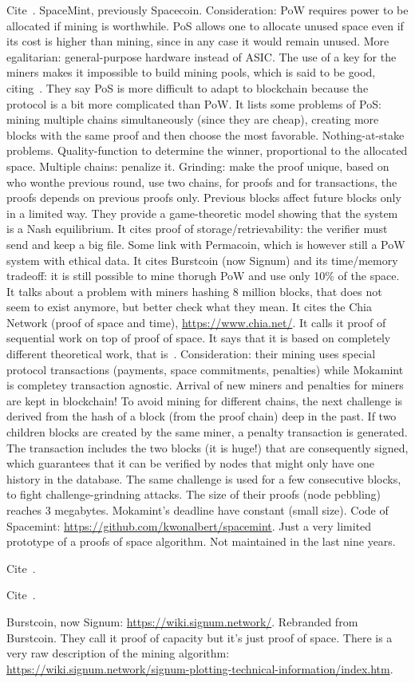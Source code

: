 Cite~\cite{ParkKFGAP18}. SpaceMint, previously Spacecoin. Consideration: PoW requires power
to be allocated if mining is worthwhile. PoS allows one to allocate unused space even if its
cost is higher than mining, since in any case it would remain unused. More egalitarian:
general-purpose hardware instead of ASIC. The use of a key for the miners makes it
impossible to build mining pools, which is said to be good, citing~\cite{MillerKKS15}.
They say PoS is more difficult to adapt to blockchain because the protocol is a bit
more complicated than PoW. It lists some problems of PoS: mining multiple chains simultaneously
(since they are cheap), creating more blocks with the same proof and then choose the most
favorable. Nothing-at-stake problems. Quality-function to determine the winner, proportional
to the allocated space. Multiple chains: penalize it. Grinding: make the proof unique, based
on who wonthe previous round, use
two chains, for proofs and for transactions, the proofs depends on previous proofs only.
Previous blocks affect future blocks only in a limited way.
They provide a game-theoretic model showing that the system is
a Nash equilibrium.
It cites proof of storage/retrievability: the verifier must send and keep a big file.
Some link with Permacoin, which is however still a PoW system with ethical data.
It cites Burstcoin (now Signum) and its time/memory tradeoff: it is still possible
to mine thorugh PoW and use only 10\% of the space.
It talks about a problem with miners hashing 8 million blocks, that does not seem to exist
anymore, but better check what they mean.
It cites the Chia Network (proof of space and time), \url{https://www.chia.net/}.
It calls it proof of sequential work on top of proof of space.
It says that it is based on completely different theoretical work, that is~\cite{AbusalahACKPR17}.
Consideration: their mining uses special protocol transactions
(payments, space commitments, penalties) while Mokamint is completey transaction agnostic.
Arrival of new miners and penalties for miners are kept in blockchain!
To avoid mining for different chains, the next challenge is derived from the hash of a block
(from the proof chain) deep in the past. If two children blocks are created by the same miner,
a penalty transaction is generated. The transaction includes the two blocks (it is huge!)
that are consequently signed, which guarantees that it can be verified by nodes that might
only have one history in the database.
The same challenge is used for a few consecutive blocks, to fight challenge-grindning attacks.
The size of their proofs (node pebbling) reaches 3 megabytes. Mokamint's deadline have constant (small size).
Code of Spacemint: \url{https://github.com/kwonalbert/spacemint}. Just a very limited prototype of a
proofs of space algorithm. Not maintained in the last nine years.

Cite~\cite{Reyzin23}.

Cite~\cite{DworkN92}.

Burstcoin, now Signum: \url{https://wiki.signum.network/}. Rebranded from Burstcoin.
They call it proof of capacity but it's just proof of space.
There is a very raw description of the mining algorithm:
\url{https://wiki.signum.network/signum-plotting-technical-information/index.htm}.
